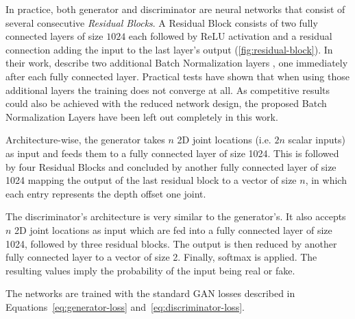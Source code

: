 In practice, both generator and discriminator are neural networks that consist of several consecutive \textit{Residual Blocks}.
A Residual Block consists of two fully connected layers of size $1024$ each followed by ReLU activation and a residual connection adding the input to the last layer's output (\autoref{fig:residual-block}).
In their work, \citet{drover18} describe two additional Batch Normalization layers \cite{ioffe15}, one immediately after each fully connected layer.
Practical tests have shown that when using those additional layers the training does not converge at all.
As competitive results could also be achieved with the reduced network design, the proposed Batch Normalization Layers have been left out completely in this work.

Architecture-wise, the generator takes $n$ 2D joint locations (i.e. $2n$ scalar inputs) as input and feeds them to a fully connected layer of size 1024.
This is followed by four Residual Blocks and concluded by another fully connected layer of size 1024 mapping the output of the last residual block to a vector of size $n$, in which each entry represents the depth offset one joint.

The discriminator's architecture is very similar to the generator's. 
It also accepts $n$ 2D joint locations as input which are fed into a fully connected layer of size 1024, followed by three residual blocks.
The output is then reduced by another fully connected layer to a vector of size 2.
Finally, softmax is applied.
The resulting values imply the probability of the input being real or fake.

The networks are trained with the standard GAN losses described in Equations~\ref{eq:generator-loss} and~\ref{eq:discriminator-loss}.
